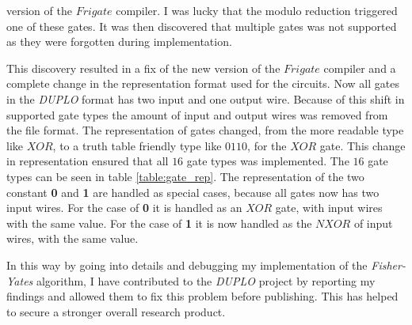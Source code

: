 \documentclass[twoside,11pt,openright]{report}
\newcommand{\FY}{\textit{Fisher-Yates} }
\newcommand{\DUPLO}{\textit{DUPLO} }
\begin{document}
version of the $Frigate$ compiler. I was lucky that the modulo reduction triggered one of these gates. It was then discovered that multiple gates was not supported as they were forgotten during implementation.

\bigskip

\begin{table}[t]
\centering
{}
\caption{A table of the 16 different gate types, that can be used in a circuit of the type used in \DUPLO}
\label{table:gate_rep}
\end{table}


This discovery resulted in a fix of the new version of the $Frigate$ compiler and a complete change in the representation format used for the circuits. Now all gates in the \DUPLO format has two input and one output wire. Because of this shift in supported gate types the amount of input and output wires was removed from the file format. The representation of gates changed, from the more readable type like $XOR$, to a truth table friendly type like $0110$, for the $XOR$ gate. This change in representation ensured that all $16$ gate types was implemented. The $16$ gate types can be seen in table \ref{table:gate_rep}. The representation of the two constant \textbf{0} and \textbf{1} are handled as special cases, because all gates now has two input wires. For the case of \textbf{0} it is handled as an $XOR$ gate, with input wires with the same value. For the case of \textbf{1} it is now handled as the $NXOR$ of input wires, with the same value.

In this way by going into details and debugging my implementation of the \FY algorithm, I have contributed to the \DUPLO project by reporting my findings and allowed them to fix this problem before publishing. This has helped to secure a stronger overall research product.
\end{document}
